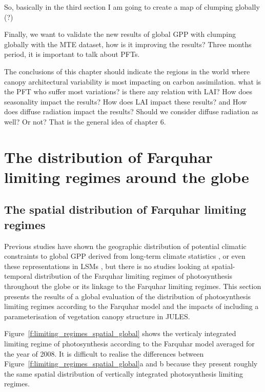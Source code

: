 So, basically in the third section I am going to create a map of clumping globally (?)

Finally, we want to validate the new results of global GPP with clumping globally with the MTE dataset, how is it improving the results? Three months period, it is important to talk about PFTs. 

The conclusions of this chapter should indicate the regions in the world where canopy architectural variability is most impacting on carbon assimilation. what is the PFT who suffer most variations? is there any relation with LAI? How does seasonality impact the results? How does LAI impact these results? and How does diffuse radiation impact the results? Should we consider diffuse radiation as well? Or not? That is the general idea of chapter 6.


\section{The distribution of Farquhar limiting regimes around the globe}\label{section:limiting_regimes}

\subsection{The spatial distribution of Farquhar limiting regimes}

Previous studies have shown the geographic distribution of potential climatic constraints to global GPP derived from long-term climate statistics \citep{nemani2003}, or even these representations in LSMs \citep{anav2015}, but there is no studies looking at spatial-temporal distribution of the Farquhar limiting regimes of photosynthesis throughout the globe or its linkage to the Farquhar limiting regimes. This section presents the results of a global evaluation of the distribution of photosynthesis limiting regimes according to the Farquhar model and the impacts of including a parameterisation of vegetation canopy structure in JULES.

Figure~\ref{f:limiting_regimes_spatial_global} shows the verticaly integrated limiting regime of photosynthesis according to the Farquhar model averaged for the year of 2008. It is difficult to realise the differences between Figure~\ref{f:limiting_regimes_spatial_global}a and b because they present roughly the same spatial distribution of vertically integrated photosynthesis limiting regimes. 

